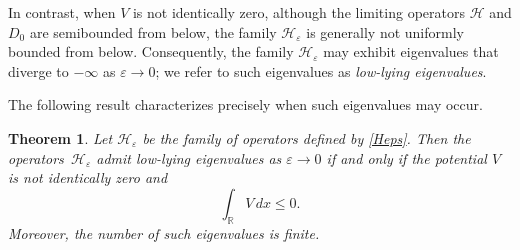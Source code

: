 \documentclass[reqno]{amsart}
\newtheorem{thm}{Theorem}
\theoremstyle{definition}
\theoremstyle{remark}
\numberwithin{equation}{section}
\newcommand{\Real}{\mathbb R}
\newcommand{\eps}{\varepsilon}
\newcommand{\cH}{\mathcal{H}}
\begin{document}
In contrast, when $V$ is not identically zero, although the limiting operators $\cH$ and $D_0$ are semibounded from below, the family $\cH_\eps$ is generally not uniformly bounded from below. Consequently, the family $\cH_\eps$ may exhibit eigenvalues that diverge to $-\infty$ as $\eps \to 0$; we refer to such eigenvalues as \emph{low-lying eigenvalues}.

The following result characterizes precisely when such eigenvalues may occur.

\begin{thm}
Let $\cH_\eps$ be the family of operators defined by \eqref{Heps}. Then the operators~$\cH_\eps$ admit low-lying eigenvalues as $\eps\to0$ if and only if the potential $V$ is not identically zero and
\begin{equation*}
  \int_{\Real}V\,dx\le 0.
\end{equation*}
Moreover, the number of such eigenvalues is finite.
\end{thm}
\end{document}
